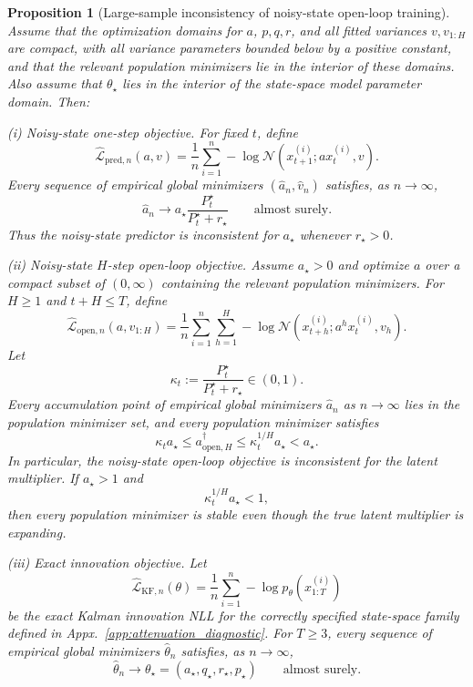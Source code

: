 \documentclass{article}
\theoremstyle{plain}
\newtheorem{proposition}{Proposition}
\theoremstyle{definition}
\theoremstyle{remark}
\begin{document}
\begin{proposition}[Large-sample inconsistency of noisy-state open-loop training]
\label{prop:linear_m_estimation}
Assume that the optimization domains for $a$, $p,q,r$, and all fitted variances $v,v_{1:H}$ are compact, with all variance parameters bounded below by a positive constant, and that the relevant population minimizers lie in the
interior of these domains. Also assume that $\theta_\star$ lies in the interior of the state-space model parameter domain. Then:

\textnormal{(i) Noisy-state one-step objective.}
For fixed $t$, define
\[
\widehat{\mathcal L}_{\mathrm{pred},n}(a,v)
=
\frac1n\sum_{i=1}^n
-\log \mathcal N \left(x_{t+1}^{(i)};a x_t^{(i)},v\right).
\]
Every sequence of empirical global minimizers $(\hat a_n,\hat v_n)$ satisfies, as $n\to\infty$,
\[
\hat a_n
\longrightarrow
a_\star\frac{P_t^\star}{P_t^\star+r_\star}
\qquad
\text{almost surely}.
\]
Thus the noisy-state predictor is inconsistent for $a_\star$ whenever
$r_\star>0$.

\textnormal{(ii) Noisy-state $H$-step open-loop objective.}
Assume $a_\star>0$ and optimize $a$ over a compact subset of $(0,\infty)$ containing the relevant population minimizers. For $H\ge1$ and $t+H\le T$, define
\[
\widehat{\mathcal L}_{\mathrm{open},n}(a,v_{1:H})
=
\frac1n\sum_{i=1}^n
\sum_{h=1}^{H}
-\log \mathcal N \left(x_{t+h}^{(i)};a^h x_t^{(i)},v_h\right).
\]
Let
\[
\kappa_t:=\frac{P_t^\star}{P_t^\star+r_\star}\in(0,1).
\]
Every accumulation point of empirical global minimizers $\hat a_n$ as $n\to\infty$ lies in the
population minimizer set, and every population minimizer satisfies
\[
\kappa_t a_\star
\le
a_{\mathrm{open},H}^\dagger
\le
\kappa_t^{1/H}a_\star
<
a_\star .
\]
In particular, the noisy-state open-loop objective is inconsistent for the
latent multiplier. If $a_\star>1$ and
\[
\kappa_t^{1/H}a_\star<1,
\]
then every population minimizer is stable even though the true latent multiplier
is expanding.

\textnormal{(iii) Exact innovation objective.}
Let
\[
\widehat{\mathcal L}_{\mathrm{KF},n}(\theta)
=
\frac1n\sum_{i=1}^n
-\log p_\theta(x_{1:T}^{(i)})
\]
be the exact Kalman innovation NLL for the correctly specified state-space
family defined in Appx.~\ref{app:attenuation_diagnostic}. For $T\ge3$, every
sequence of empirical global minimizers $\hat\theta_n$ satisfies, as $n\to\infty$,
\[
\hat\theta_n
\longrightarrow
\theta_\star
=
(a_\star,q_\star,r_\star,p_\star)
\qquad
\text{almost surely}.
\]
\end{proposition}
\end{document}
